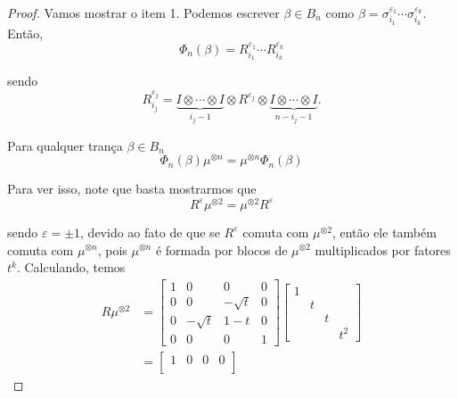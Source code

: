 	\begin{proof}
		Vamos mostrar o item 1. Podemos escrever $\beta\in B_n$ como $\beta = \sigma_{i_1}^{\varepsilon_1}\cdots\sigma_{i_k}^{\varepsilon_k}$. Então,
		\begin{equation*}
		\Phi_n(\beta) = R_{i_1}^{\varepsilon_1}\cdots R_{i_k}^{\varepsilon_k}
		\end{equation*}
		\par\vspace{0.3cm} sendo 
		\begin{equation*}
		R_{i_j}^{\varepsilon_j} = \underbrace{I\otimes \cdots \otimes I}_{i_j - 1}\otimes R^{\varepsilon_j}\otimes \underbrace{I\otimes \cdots\otimes I}_{n-i_j-1}.
		\end{equation*} 
		\par\vspace{0.3cm} Para qualquer trança $\beta\in B_n$
		\begin{equation*}
		\Phi_n(\beta)\mu^{\otimes n} = \mu^{\otimes n}\Phi_n(\beta)
		\end{equation*}
		\par\vspace{0.3cm} Para ver isso, note que basta mostrarmos que
		\begin{equation}
		\label{R mi duas vezes}
		R^{\varepsilon}\mu^{\otimes 2} = \mu^{\otimes 2}R^{\varepsilon}
		\end{equation}
		\par\vspace{0.3cm} sendo $\varepsilon=\pm1$, devido ao fato de que se $R^{\varepsilon}$ comuta com $\mu^{\otimes 2}$, então ele também comuta com $\mu^{\otimes n}$, pois $\mu^{\otimes n}$ é formada por blocos de $\mu^{\otimes 2}$ multiplicados por fatores $t^k$. Calculando, temos
		\begin{align*}
		R\mu^{\otimes 2} &= \begin{bmatrix}
		1 & 0 & 0 & 0 \\
		0 & 0 & -\sqrt{t} & 0 \\
		0 & -\sqrt{t} & 1-t & 0 \\
		0 & 0 & 0 & 1
		\end{bmatrix}\begin{bmatrix}
		1 \\
		& t \\
		& & t \\
		& & & t^2
		\end{bmatrix} \\
		&= \begin{bmatrix}
		1 & 0 & 0 & 0 \\

\end{bmatrix}
\end{align*}
\end{proof}
